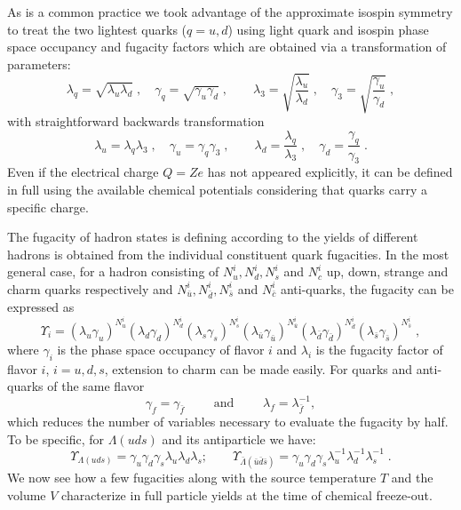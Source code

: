 As is a common practice we took advantage of the approximate isospin symmetry to treat the two lightest quarks ($q = u,d$) using light quark and isospin phase space occupancy and fugacity factors which are obtained via a transformation of parameters:
\begin{equation}\label{eq:q3toud}
\lambda_q = \sqrt{\lambda_u\lambda_d}\;,\quad
\gamma_q = \sqrt{\gamma_u\gamma_d}\;,\qquad 
\lambda_3=\sqrt{\frac{\lambda_u}{\lambda_d}}\;,\quad
\gamma_3=\sqrt{\frac{\gamma_u}{\gamma_d}}\;,
\end{equation}
with straightforward backwards transformation
\begin{equation}\label{eq:udtoq3}
\lambda_u = \lambda_q\lambda_3\;,\quad \gamma_u = \gamma_q\gamma_3\;,\qquad 
\lambda_d = \frac{\lambda_q}{\lambda_3}\;,\quad \gamma_d = \frac{\gamma_q}{\gamma_3}\;.
\end{equation}
Even if the electrical charge $Q=Ze$ has not appeared explicitly, it can be defined in full using the available chemical potentials considering that quarks carry a specific charge. 

The fugacity of hadron states is defining according to  the yields of different hadrons is obtained from the individual constituent quark fugacities. In the most general case, for a hadron consisting of $N_u^i, N_d^i ,N_s^i$ and $N_c^i$ up, down, strange and charm 
quarks respectively and $N_{\bar{u}}^i,N_{\bar{d}}^i,N_{\bar{s}}^i$ and $N_{\bar{c}}^i$ anti-quarks, the fugacity can be expressed as
\begin{equation} 
\label{eq:fugacity}
\Upsilon_i = (\lambda_u\gamma_u)^{N_u^i}(\lambda_d\gamma_d)^{N_d^i}(\lambda_s\gamma_s)^{N_s^i}
 (\lambda_{\bar{u}}\gamma_{\bar{u}})^{N_{\bar{u}}^i}(\lambda_{\bar{d}}\gamma_{\bar{d}})^{N_{\bar{d}}^i}(\lambda_{\bar{s}}\gamma_{\bar{s}})^{N_{\bar{s}}^i}\;,
\end{equation} 
where $\gamma_i$ is the phase space occupancy of flavor $i$ and $\lambda_i$ is the fugacity factor of flavor $i$, $i=u,d,s$, extension to charm can be made easily. For quarks and anti-quarks of the same flavor
\begin{equation} 
\gamma_f = \gamma_{\bar{f}}\qquad\text{ and }\qquad \lambda_f = \lambda_{\bar{f}}^{-1},
\end{equation}
which reduces the number of variables necessary to evaluate the fugacity by half. To be specific, for $\Lambda(uds)$ and its antiparticle we have:
\begin{equation} 
\Upsilon_{\Lambda(uds)}= \gamma_u\gamma_d\gamma_s\lambda_u\lambda_d\lambda_s;\qquad
 \Upsilon_{\bar{\Lambda}(\bar{u}\bar{d}\bar{s})}= \gamma_u\gamma_d\gamma_s\lambda_u^{-1}\lambda_d^{-1}\lambda_s^{-1}\;.
\end{equation} 
We now see how a few fugacities along with the source temperature $T$ and the volume $V$ characterize in full particle yields at the time of chemical freeze-out. 

